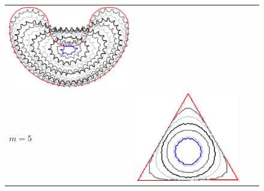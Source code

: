 {\begin{figure}
\begin{tabular}{p{3em}ccc}
\includegraphics[scale=0.25]{figures/chapter6/level-effect/bean/improve/len_pen0/radius-9/level1/summary.pdf} \\[2em]
$m=5$ & \includegraphics[scale=0.25]{figures/chapter6/level-effect/triangle/improve/len_pen0/radius-9/level5/summary.pdf} &

\end{tabular}
\end{figure}}
